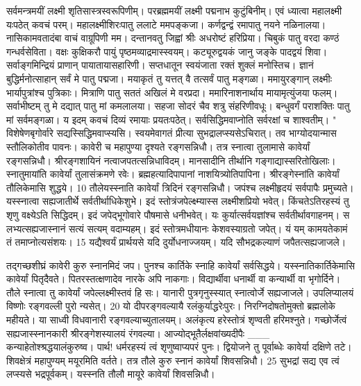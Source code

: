 सर्वमन्त्रमयीं लक्ष्मी शृतिसास्त्रस्वरूपिणीम्।
 परब्रह्ममयीं लक्ष्मी पद्मनाभ कुटुंबिनीम्।
 एवं ध्यात्वा महालक्ष्मी यःपठेत् कवचं परम्।
 महालक्ष्मीशिरःपातु ललाटे ममपङ्कजा।
 कर्णद्वन्द्वं रमापातु नयने नळिनालया।
 नासिकामवतादंबा वाचं वाग्रूपिणी मम।
 दन्तानवतु जिह्वां श्रीः अधरोष्टं हरिप्रिया।
 चिबुकं पातु वरदा कण्ठं गन्धर्वसेविता।
 वक्षः कुक्षिकरौ पायुं पृष्ठमव्याद्रमास्स्वयम्।
 कट्यूरुद्वयकं जानु जङ्के पादद्वयं शिवा।
 सर्वाङ्गमिन्द्रियं प्राणान् पायातायासहारिणी।
 सप्तधातून स्वयंजाता रक्तं शुक्लं मनोस्तिच।
 ज्ञानं बुद्धिर्मनोत्साहान् सर्वं मे पातु पद्मजा।
 मयाकृतं तु यत्तत् वै तत्सर्वं पातु मङ्गळा।
 ममायुरङ्गान् लक्ष्मीः भार्यापुत्रांश्च पुत्रिकाः।
 मित्राणि पातु सततं अखिलं मे वरप्रदा।
 ममारिनाशनार्थाय मायामृत्युंजया फलम्।
 सर्वाभीष्टम् तु मे दद्यात् पातु मां कमलालया।
 सहजा सोदरं चैव शत्रु संहरिणीवधूः।
 बन्धुवर्गं पराशक्तिः पातु मां सर्वमङ्गळा।
 य इदम् कवचं दिव्यं रमायाः प्रयतःपठेत्।
 सर्वसिद्धिमवाप्नोति सर्वरक्षां च शाश्वतीम्।
 "
विशेषेणबृगोर्वारे सद्यस्सिद्धिमवाप्स्यसि।
 स्वयमेवागतं प्रीत्या सुभद्रालप्स्यसेऽचिरात्।
 तव भाग्योदयान्मास स्तौलिकोतीव पावनः।
 कावेरी च महापुण्या दृश्यते रङ्गसन्निधौ।
 तत्र स्नात्वा तुलामासे कावेर्यां रङ्गसन्निधौ।
 श्रीरङ्गशायिनं नत्वाजपतत्सन्निधाविदम्।
 मानसादीनि तीर्थानि गङ्गाद्यास्सरितोखिलाः।
 स्नातुमायांति कावेर्यां तुलासंक्रमणे रवेः।
 ब्रह्महत्यादिपापानां नाशयित्र्योतिपापिना।
 श्रीरङ्गेस्नांति कावेर्यां तौलिकेमासि शुद्धये।
 10 तौलेयस्स्नाति कावेर्यां त्रिदिनं रङ्गसन्निधौ।
 जपंश्च लक्ष्मीहृदयं सर्वपापैः प्रमुच्यते।
 यस्स्नात्वा सह्यजातीर्थे सर्वतीर्थाधिकेशुभे।
 इदं स्तोत्रंजपेल्क्ष्म्यास्स लक्ष्मीशप्रियो भवेत्।
 किंचतेऽतिरहस्यं तु शृणु वक्ष्येऽति सिद्धिदम्।
 इदं जपेद्भूगोवारे पौषमासे धनीभवेत्।
 यः कुर्यात्सर्वयज्ञांश्च सर्वतीर्थावगाहनम्।
 स लभ्यत्सह्यजास्नानं सत्यं सत्यम् वदाम्यहम्।
 इदं स्तोत्रमधीयानः केशवस्याग्रतो जपेत्।
 यं यम् कामयतेकामं तं तमाप्नोत्यसंशयः।
 15 यद्यैश्वर्यं प्रार्थयसे यदि दुर्योधनाज्जयम्।
 यदि सौभद्रकल्याणं जपैतत्सह्यजाजले।
 
तद्गच्छशीघ्रं कावेरी कुरु स्नानमिदं जप।
 पुनश्च कार्तिके स्नाहि कावेर्यां सर्वसिद्धये।
 यस्स्नातिकार्तिकेमासि कावेर्यां पितृदैवते।
 पितरस्तत्क्षणादेव नारके अपि नाकगाः।
 विद्यार्थीवा धनार्थी वा कन्यार्थी वा भृगोर्दिने।
 तौले स्नात्वा तु कावेर्यां जपेल्लक्ष्मीस्तवं हि सः।
 यानारी पुत्रगृनुस्स्यात् स्नात्वोर्जे सह्यजाजले।
 उपलिप्यालयं विष्णोः रङ्गवल्ली पुरो न्यसेत्।
 20 यो दीपरङ्गवल्यायै रलंकुर्याद्धरेःपुरः।
 निरग्निदोषतोमुक्तो ब्रह्मलोके महीयते।
 या साध्वी विधवानारी रङ्गवल्याच्युतालयम्।
 अलंकृत्य हरेस्तोत्रं शृण्वती हरिमश्नुते।
 गच्छोर्जेत्वं सह्यजास्स्नानकारी
श्रीरङ्गेशस्यालयं रंगवल्या।
 आज्योद्भूतैर्लक्षवांख्यदीपैः
___ कन्याहेतोश्श्रद्धयालंकुरुष्व।
 पार्थ! धर्मरहस्यं त्वं शृणुष्वाप्यपरं पुनः।
 द्वियोजने तु पूर्वाब्धेः कावेर्या दक्षिणे तटे।
 शिवक्षेत्रं महापुण्यम् मयूरमिति वर्तते।
 तत्र तौले कुरु स्नानं कावेर्यां शिवसन्निधौ।
 25 सुभद्रां सद्य एव त्वं लप्स्यसे भद्रपूर्वकम्।
 यस्स्नति तौलौ मायूरे कावेर्यां शिवसन्निधौ।
 
